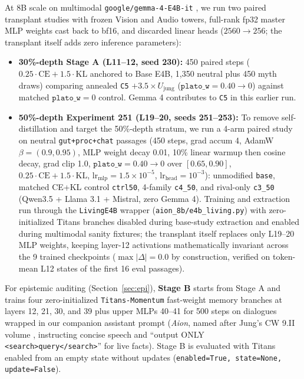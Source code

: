 \documentclass[conference]{IEEEtran}
\begin{document}
At 8B scale on multimodal \texttt{google/gemma-4-E4B-it} \cite{gemmateam2026gemma4}, we run two paired transplant studies with frozen Vision and Audio towers, full-rank fp32 master MLP weights cast back to bf16, and discarded linear heads ($2560\to256$; the transplant itself adds zero inference parameters):
\begin{itemize}
  \item \textbf{30\%-depth Stage A (L11--12, seed 230):} 450 paired steps ($0.25\cdot\text{CE}+1.5\cdot\text{KL}$ anchored to Base E4B, 1,350 neutral plus 450 myth draws) comparing annealed \texttt{C5} $+3.5\times U_{\text{jung}}$ ($\texttt{plato\_w}=0.40\to0$) against matched $\texttt{plato\_w}=0$ control. Gemma 4 contributes to \texttt{C5} in this earlier run.
  \item \textbf{50\%-depth Experiment 251 (L19--20, seeds 251--253):} To remove self-distillation and target the 50\%-depth stratum, we run a 4-arm paired study on neutral \texttt{gut+proc+chat} passages (450 steps, grad accum 4, AdamW $\beta=(0.9,0.95)$, MLP weight decay 0.01, 10\% linear warmup then cosine decay, grad clip 1.0, $\texttt{plato\_w}=0.40\to0$ over $[0.65,0.90]$, $0.25\cdot\text{CE}+1.5\cdot\text{KL}$, $\text{lr}_{\text{mlp}}=1.5\times10^{-5}$, $\text{lr}_{\text{head}}=10^{-3}$): unmodified \texttt{base}, matched CE+KL control \texttt{ctrl50}, 4-family \texttt{c4\_50}, and rival-only \texttt{c3\_50} (Qwen3.5 + Llama 3.1 + Mistral, zero Gemma 4). Training and extraction run through the \texttt{LivingE4B} wrapper (\texttt{aion\_8b/e4b\_living.py}) with zero-initialized Titans branches disabled during base-study extraction and enabled during multimodal sanity fixtures; the transplant itself replaces only L19--20 MLP weights, keeping layer-12 activations mathematically invariant across the 9 trained checkpoints ($\max|\Delta|=0.0$ by construction, verified on token-mean L12 states of the first 16 eval passages).
\end{itemize}
For epistemic auditing (Section~\ref{sec:epi}), \textbf{Stage B} starts from Stage A and trains four zero-initialized \texttt{Titans-Momentum} fast-weight memory branches \cite{behrouz2024titans} at layers 12, 21, 30, and 39 plus upper MLPs 40--41 for 500 steps on dialogues wrapped in our companion assistant prompt (\textit{Aion}, named after Jung's CW 9.II volume \cite{jung1968aion}, instructing concise speech and ``output ONLY \texttt{<search>query</search>}'' for live facts). Stage B is evaluated with Titans enabled from an empty state without updates (\texttt{enabled=True, state=None, update=False}).
\end{document}
